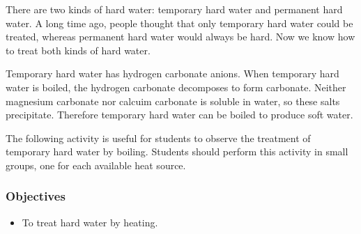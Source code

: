 There are two kinds of hard water: temporary hard water and permanent hard water. A long time ago, people thought that only temporary hard water could be treated, whereas permanent hard water would always be hard. Now we know how to treat both kinds of hard water.

Temporary hard water has hydrogen carbonate anions. When temporary hard water is boiled, the hydrogen carbonate decomposes to form carbonate. Neither magnesium carbonate nor calcuim carbonate is soluble in water, so these salts precipitate. Therefore temporary hard water can be boiled to produce soft water.

The following activity is useful for students to observe the treatment of temporary hard water by boiling. Students should perform this activity in small groups, one for each available heat source.

\subsubsection*{Objectives}
\begin{itemize}
\item{To treat hard water by heating.}
\end{itemize}

